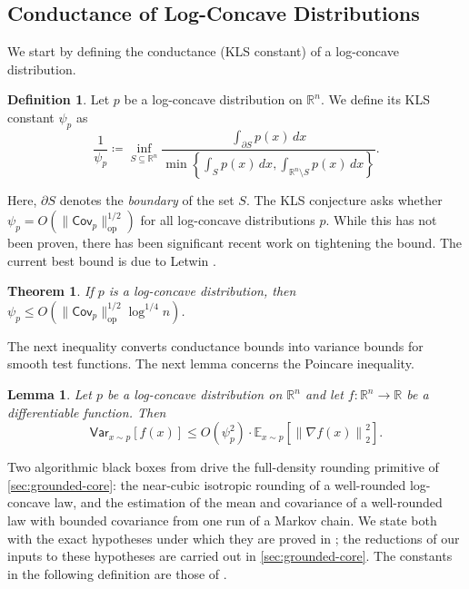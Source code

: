 \documentclass[11pt]{article}
\numberwithin{equation}{section}
\newtheorem{theorem}{Theorem}
\newtheorem{lemma}{Lemma}[section]
\theoremstyle{definition}
\newtheorem{definition}[definition]{Definition}
\newcommand{\g}{\nabla}
\newcommand{\R}{\mathbb{R}}
\newcommand{\E}[2]{\mathbb{E}_{#1}\left[#2\right]}
\newcommand{\V}[2]{\mathsf{Var}_{#1}\left[#2\right]}
\newcommand{\C}{\mathsf{Cov}}
\newcommand{\norm}[1]{\left\lVert#1\right\rVert}
\newcommand{\op}{\mathrm{op}}
\begin{document}
\subsection{Conductance of Log-Concave Distributions}\label{subsec:ball_walk}

We start by defining the conductance (KLS constant) of a log-concave
distribution.

\begin{definition}
\label{def:kls}
Let $p$ be a log-concave distribution on
$\R^n$.
We define its KLS constant $\psi_p$ as
\[
\frac{1}{\psi_p} \coloneq \inf_{S \subseteq \R^n} \frac{\int_{\partial S} p(x) \, dx}{\min\left\{\int_S p(x) \, dx, \int_{\R^n \setminus S} p(x) \, dx \right\}}.
\]
\end{definition}
Here, $\partial S$ denotes the \emph{boundary} of the set
$S$.
The KLS conjecture \cite{KLS95:journal} asks whether
$\psi_p = O(\|\C_p\|_{\op}^{1/2})$ for all log-concave distributions
$p$.
While this has not been proven, there has been significant recent work on
tightening the bound.
The current best bound is due to Letwin \cite{L26:arxiv}.

\begin{theorem}
\label{thm:klsbound}
If $p$ is a log-concave distribution, then
$\psi_p \leq O(\|\C_p\|_{\op}^{1/2} \log^{1/4} n)$.
\end{theorem}

The next inequality converts conductance bounds into variance bounds for smooth
test functions.
The next lemma concerns the Poincare inequality.

\begin{lemma}
\label{lemma:poincare}
Let $p$ be a log-concave distribution on
$\R^n$ and let
$f: \R^n \to \R$ be a differentiable function.
Then
\[
\V{x \sim p}{f\left(x\right)}
\le
O\left(\psi_p^2\right) \cdot \E{x \sim p}{\norm{\g f\left(x\right)}_2^2}.
\]
\end{lemma}

Two algorithmic black boxes from \cite{KV25} drive the full-density rounding
primitive of \cref{sec:grounded-core}: the near-cubic isotropic rounding of a
well-rounded log-concave law, and the estimation of the mean and covariance of
a well-rounded law with bounded covariance from one run of a Markov chain.
We state both with the exact hypotheses under which they are proved in
\cite{KV25}; the reductions of our inputs to these hypotheses are carried out
in \cref{sec:grounded-core}.
The constants in the following definition are those of
\cite[Assumption~4.4]{KV25}.
\end{document}
